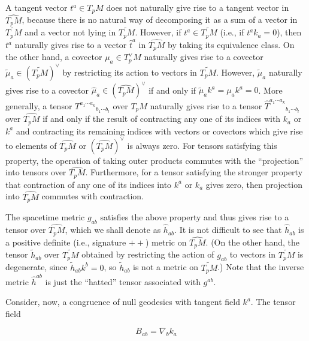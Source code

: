 A tangent vector \(t^a\in T_pM\) does not naturally give rise to a tangent vector in
\(\widehat{T_pM}\), because there is no natural way of decomposing it as a sum of a
vector in \(\widetilde{T_pM}\) and a vector not lying in \(\widetilde{T_pM}\). However,
if \(t^a\in\widetilde{T_pM}\) (i.e., if \(t^ak_a=0\)), then \(t^a\) naturally gives rise to a
vector \(\widehat t^a\) in \(\widehat{T_pM}\) by taking its equivalence class. On the
other hand, a covector \(\mu_a\in T_p^\vee M\) naturally gives rise to a covector
\(\widetilde\mu_a\in(\widetilde{T_pM})^\vee\) by restricting its action to vectors in
\(\widetilde{T_pM}\). However, \(\widetilde\mu_a\) naturally gives rise to a covector
\(\widehat\mu_a\in(\widehat{T_pM})^\vee\) if and only if
\(\widetilde\mu_ak^a=\mu_ak^a=0\). More generally, a tensor
\(T^{a_1\cdots a_k}{}_{b_1\cdots b_l}\) over \(T_pM\) naturally gives rise to a tensor
\(\widehat T^{a_1\cdots a_k}{}_{b_1\cdots b_l}\) over \(\widehat{T_pM}\) if and only if
the result of contracting any one of its indices with \(k_a\) or \(k^a\) and contracting
its remaining indices with vectors or covectors which give rise to elements of
\(\widehat{T_pM}\) or \((\widehat{T_pM})^\vee\) is always zero. For tensors satisfying
this property, the operation of taking outer products commutes with the
``projection'' into tensors over \(\widehat{T_pM}\). Furthermore, for a tensor satisfying
the stronger property that contraction of any one of its indices into \(k^a\) or \(k_a\)
gives zero, then projection into \(\widehat{T_pM}\) commutes with contraction.

The spacetime metric \(g_{ab}\) satisfies the above property and thus gives rise to a
tensor over \(\widehat{T_pM}\), which we shall denote as \(\widehat h_{ab}\). It is not
difficult to see that \(\widehat h_{ab}\) is a positive definite (i.e., signature \(++\))
metric on \(\widehat{T_pM}\). (On the other hand, the tensor \(\widetilde h_{ab}\) over
\(\widetilde{T_pM}\) obtained by restricting the action of \(g_{ab}\) to vectors in
\(\widetilde{T_pM}\) is degenerate, since \(\widetilde h_{ab}k^b=0\), so
\(\widetilde h_{ab}\) is not a metric on \(\widetilde{T_pM}\).) Note that the inverse
metric \(\widehat h^{ab}\) is just the ``hatted'' tensor associated with \(g^{ab}\).

Consider, now, a congruence of null geodesics with tangent field \(k^a\). The tensor
field

\begin{equation}
  B_{ab}=\nabla_bk_a
  \tag{9.2.25}\label{eq:9.2.25}
\end{equation}


